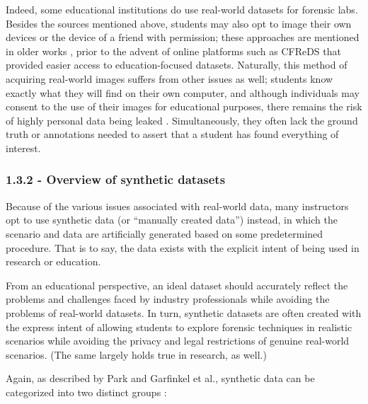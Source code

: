 Indeed, some educational institutions do use real-world datasets for
forensic labs. Besides the sources mentioned above, students may also
opt to image their own devices or the device of a friend with
permission; these approaches are mentioned in older works
\cite{andersonComparativeStudyTeaching2006,mochForensicImageGenerator2009},
prior to the advent of online platforms such as CFReDS that provided
easier access to education-focused datasets. Naturally, this method of
acquiring real-world images suffers from other issues as well; students
know exactly what they will find on their own computer, and although
individuals may consent to the use of their images for educational
purposes, there remains the risk of highly personal data being leaked
\cite{garfinkelBringingScienceDigital2009}. Simultaneously, they
often lack the ground truth or annotations needed to assert that a
student has found everything of interest.

\subsubsection{1.3.2 - Overview of synthetic
datasets}\label{overview-of-synthetic-datasets}

Because of the various issues associated with real-world data, many
instructors opt to use synthetic data (or ``manually created data'')
instead, in which the scenario and data are artificially generated based
on some predetermined procedure. That is to say, the data exists with
the explicit intent of being used in research or education.

From an educational perspective, an ideal dataset should accurately
reflect the problems and challenges faced by industry professionals
while avoiding the problems of real-world datasets. In turn, synthetic
datasets are often created with the express intent of allowing students
to explore forensic techniques in realistic scenarios while avoiding the
privacy and legal restrictions of genuine real-world scenarios. (The
same largely holds true in research, as well.)

Again, as described by Park and Garfinkel et al., synthetic data can be
categorized into two distinct groups
\cite{garfinkelBringingScienceDigital2009,parkTREDEVMPOPCultivating2018}:

